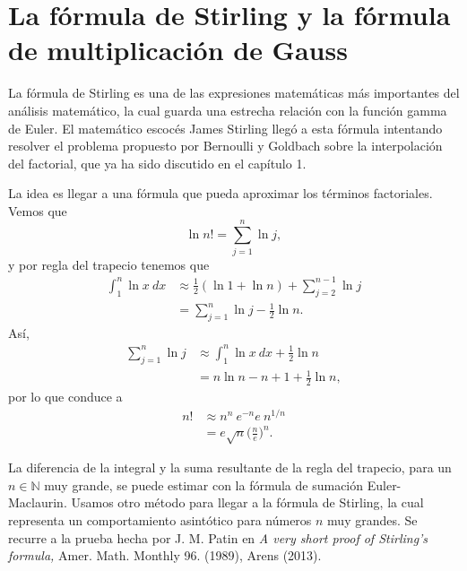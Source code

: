 \section{La fórmula de Stirling y la fórmula de multiplicación de Gauss}
La fórmula de Stirling es una de las expresiones matemáticas más importantes del análisis matemático, la cual guarda una estrecha relación con la función gamma de Euler. El matemático escocés James Stirling llegó a esta fórmula intentando resolver el problema propuesto por Bernoulli y Goldbach sobre la interpolación del factorial, que ya ha sido discutido en el capítulo 1. 

La idea es llegar a una fórmula que pueda aproximar los términos factoriales. Vemos que $$\ln n! = \sum_{j = 1}^{n}\ln j,$$ y por regla del trapecio tenemos que 
\begin{align*}
	\int_{1}^{n}\ln x\ dx &\approx \frac{1}{2}(\ln 1+\ln n)+\sum_{j = 2}^{n-1}\ln j\\
	&= \sum_{j = 1}^{n}\ln j-\frac{1}{2}\ln n.
\end{align*}
Así, 
\begin{align*}
	\sum_{j = 1}^{n}\ln j &\approx \int_{1}^{n}\ln x\ dx+\frac{1}{2}\ln n\\
	&= n \ln n - n + 1 + \frac{1}{2}\ln n,
\end{align*}
por lo que conduce a 
\begin{align*}
	n! &\approx n^n\ e^{-n}e\ n^{1/n}\\
	&= e\sqrt{n}\bigg(\frac{n}{e}\bigg)^n.
\end{align*}

La diferencia de la integral y la suma resultante de la regla del trapecio, para un $n \in \mathbb{N}$ muy grande, se puede estimar con la fórmula de sumación Euler-Maclaurin. Usamos otro método para llegar a la fórmula de Stirling, la cual representa un comportamiento asintótico para números $n$ muy grandes. Se recurre a la prueba hecha por J. M. Patin en \textit{A very short proof of Stirling's formula,} Amer. Math. Monthly 96. (1989), Arens (2013).

